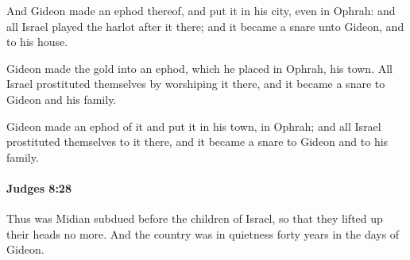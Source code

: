 			\begin{versebox}
					\item[BHS] 
					\item[ASV] And Gideon made an ephod thereof, and put it in his city, even in Ophrah: and all Israel played the harlot after it there; and it became a snare unto Gideon, and to his house.
					\item[NIV] Gideon made the gold into an ephod, which he placed in Ophrah, his town. All Israel prostituted themselves by worshiping it there, and it became a snare to Gideon and his family.
					\item[NRSV] Gideon made an ephod of it and put it in his town, in Ophrah; and all Israel prostituted themselves to it there, and it became a snare to Gideon and to his family.
			\end{versebox}

		\paragraph{Judges 8:28} %
			\label{JUDGES-8-28}

			Thus was Midian subdued before the children of Israel, so that they lifted up their heads no more. And the country was in quietness forty years in the days of Gideon.

